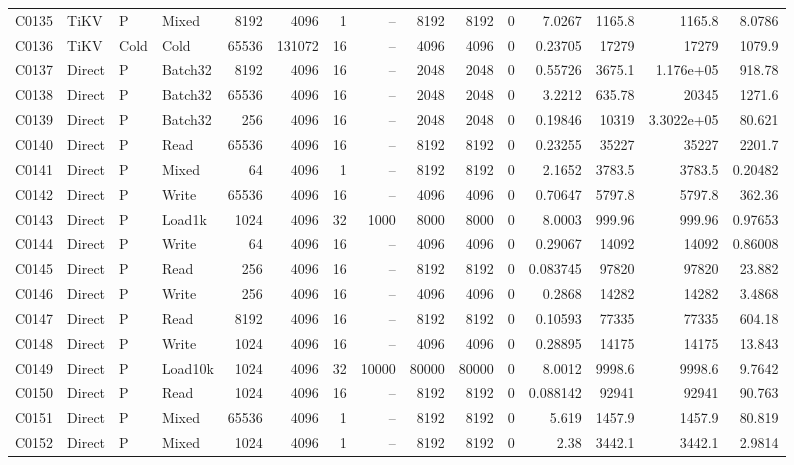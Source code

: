\begin{landscape}
\begin{longtable}{llllrrrrrrrrrrr}
C0135 & TiKV & P & Mixed & 8192 & 4096 & 1 & -- & 8192 & 8192 & 0 & 7.0267 & 1165.8 & 1165.8 & 8.0786\\
C0136 & TiKV & Cold & Cold & 65536 & 131072 & 16 & -- & 4096 & 4096 & 0 & 0.23705 & 17279 & 17279 & 1079.9\\
C0137 & Direct & P & Batch32 & 8192 & 4096 & 16 & -- & 2048 & 2048 & 0 & 0.55726 & 3675.1 & 1.176e+05 & 918.78\\
C0138 & Direct & P & Batch32 & 65536 & 4096 & 16 & -- & 2048 & 2048 & 0 & 3.2212 & 635.78 & 20345 & 1271.6\\
C0139 & Direct & P & Batch32 & 256 & 4096 & 16 & -- & 2048 & 2048 & 0 & 0.19846 & 10319 & 3.3022e+05 & 80.621\\
C0140 & Direct & P & Read & 65536 & 4096 & 16 & -- & 8192 & 8192 & 0 & 0.23255 & 35227 & 35227 & 2201.7\\
C0141 & Direct & P & Mixed & 64 & 4096 & 1 & -- & 8192 & 8192 & 0 & 2.1652 & 3783.5 & 3783.5 & 0.20482\\
C0142 & Direct & P & Write & 65536 & 4096 & 16 & -- & 4096 & 4096 & 0 & 0.70647 & 5797.8 & 5797.8 & 362.36\\
C0143 & Direct & P & Load1k & 1024 & 4096 & 32 & 1000 & 8000 & 8000 & 0 & 8.0003 & 999.96 & 999.96 & 0.97653\\
C0144 & Direct & P & Write & 64 & 4096 & 16 & -- & 4096 & 4096 & 0 & 0.29067 & 14092 & 14092 & 0.86008\\
C0145 & Direct & P & Read & 256 & 4096 & 16 & -- & 8192 & 8192 & 0 & 0.083745 & 97820 & 97820 & 23.882\\
C0146 & Direct & P & Write & 256 & 4096 & 16 & -- & 4096 & 4096 & 0 & 0.2868 & 14282 & 14282 & 3.4868\\
C0147 & Direct & P & Read & 8192 & 4096 & 16 & -- & 8192 & 8192 & 0 & 0.10593 & 77335 & 77335 & 604.18\\
C0148 & Direct & P & Write & 1024 & 4096 & 16 & -- & 4096 & 4096 & 0 & 0.28895 & 14175 & 14175 & 13.843\\
C0149 & Direct & P & Load10k & 1024 & 4096 & 32 & 10000 & 80000 & 80000 & 0 & 8.0012 & 9998.6 & 9998.6 & 9.7642\\
C0150 & Direct & P & Read & 1024 & 4096 & 16 & -- & 8192 & 8192 & 0 & 0.088142 & 92941 & 92941 & 90.763\\
C0151 & Direct & P & Mixed & 65536 & 4096 & 1 & -- & 8192 & 8192 & 0 & 5.619 & 1457.9 & 1457.9 & 80.819\\
C0152 & Direct & P & Mixed & 1024 & 4096 & 1 & -- & 8192 & 8192 & 0 & 2.38 & 3442.1 & 3442.1 & 2.9814\\

\end{longtable}
\end{landscape}
